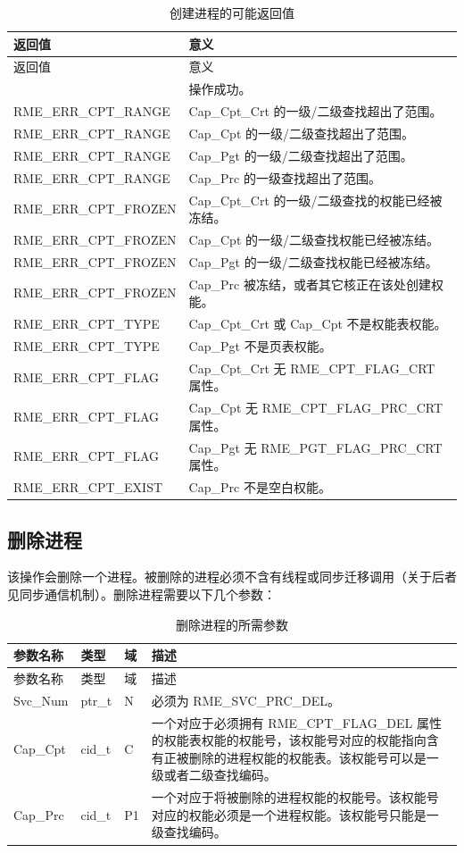 \begin{xltabular}{\textwidth}{@{}>{\hsize\raggedright\arraybackslash}X>{\hsize\raggedright\arraybackslash}X@{}}
\caption{创建进程的可能返回值}\label{tab:4-11-create-process-return-values}\\
\toprule
返回值 & 意义\tabularnewline
\endfirsthead
\toprule
返回值 & 意义\tabularnewline
\midrule
\endhead
\bottomrule
{} & 操作成功。\tabularnewline
    RME\_ERR\_CPT\_RANGE & Cap\_Cpt\_Crt 的一级/二级查找超出了范围。\tabularnewline
    RME\_ERR\_CPT\_RANGE & Cap\_Cpt 的一级/二级查找超出了范围。\tabularnewline
    RME\_ERR\_CPT\_RANGE & Cap\_Pgt 的一级/二级查找超出了范围。\tabularnewline
    RME\_ERR\_CPT\_RANGE & Cap\_Prc 的一级查找超出了范围。\tabularnewline
    RME\_ERR\_CPT\_FROZEN & Cap\_Cpt\_Crt 的一级/二级查找的权能已经被冻结。\tabularnewline
    RME\_ERR\_CPT\_FROZEN & Cap\_Cpt 的一级/二级查找权能已经被冻结。\tabularnewline
    RME\_ERR\_CPT\_FROZEN & Cap\_Pgt 的一级/二级查找权能已经被冻结。\tabularnewline
    RME\_ERR\_CPT\_FROZEN & Cap\_Prc 被冻结，或者其它核正在该处创建权能。\tabularnewline
    RME\_ERR\_CPT\_TYPE & Cap\_Cpt\_Crt 或 Cap\_Cpt 不是权能表权能。\tabularnewline
    RME\_ERR\_CPT\_TYPE & Cap\_Pgt 不是页表权能。\tabularnewline
    RME\_ERR\_CPT\_FLAG & Cap\_Cpt\_Crt 无 RME\_CPT\_FLAG\_CRT 属性。\tabularnewline
    RME\_ERR\_CPT\_FLAG & Cap\_Cpt 无 RME\_CPT\_FLAG\_PRC\_CRT 属性。\tabularnewline
    RME\_ERR\_CPT\_FLAG & Cap\_Pgt 无 RME\_PGT\_FLAG\_PRC\_CRT 属性。\tabularnewline
    RME\_ERR\_CPT\_EXIST & Cap\_Prc 不是空白权能。\tabularnewline
\end{xltabular}

\subsection{删除进程}\label{subsec:4-delete-a-process}

该操作会删除一个进程。被删除的进程必须不含有线程或同步迁移调用（关于后者见同步通信机制）。删除进程需要以下几个参数：

\begin{xltabular}{\textwidth}{@{}>{\hsize\raggedright\arraybackslash}X>{\hsize\raggedright\arraybackslash}X>{\hsize\raggedright\arraybackslash}X>{\hsize\raggedright\arraybackslash}X@{}}
\caption{删除进程的所需参数}\label{tab:4-12-delete-process-parameters}\\
\toprule
参数名称 & 类型 & 域 & 描述\tabularnewline
\endfirsthead
\toprule
参数名称 & 类型 & 域 & 描述\tabularnewline
\midrule
\endhead
\bottomrule
\endlastfoot
Svc\_Num & ptr\_t & N & 必须为 RME\_SVC\_PRC\_DEL。\tabularnewline
Cap\_Cpt & cid\_t & C &
一个对应于必须拥有 RME\_CPT\_FLAG\_DEL 属性的权能表权能的权能号，该权能号对应的权能指向含有正被删除的进程权能的权能表。该权能号可以是一级或者二级查找编码。\tabularnewline
Cap\_Prc & cid\_t & P1 &
一个对应于将被删除的进程权能的权能号。该权能号对应的权能必须是一个进程权能。该权能号只能是一级查找编码。\tabularnewline
\end{xltabular}

